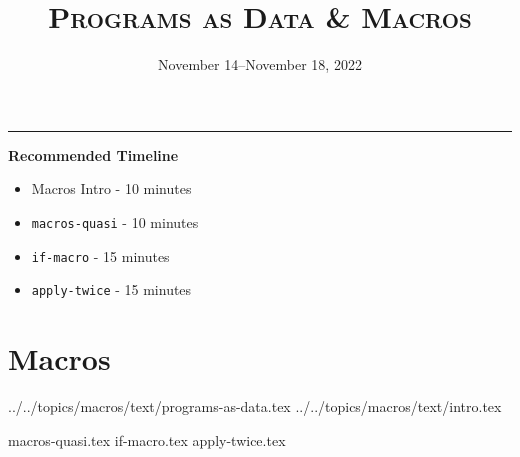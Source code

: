 \documentclass{exam}
\title{\textsc{Programs as Data \& Macros}}
\date{November 14--November 18, 2022}
\begin{document}
\maketitle
\rule{\textwidth}{0.15em}

\begin{guide}
\begin{blocksection}
    \textbf{Recommended Timeline}
    \begin{itemize}
        \item Macros Intro - 10 minutes
        \item \lstinline{macros-quasi} - 10 minutes
        \item \lstinline{if-macro} - 15 minutes
        \item \lstinline{apply-twice} - 15 minutes
    \end{itemize}
\end{blocksection}
\newpage
\end{guide}

\section{Macros}
 {../../topics/macros/text/}{programs-as-data.tex}
 {../../topics/macros/text/}{intro.tex}
\begin{questions}
{macros-quasi.tex}
{if-macro.tex}
{apply-twice.tex}
\end{questions}
\end{document}
